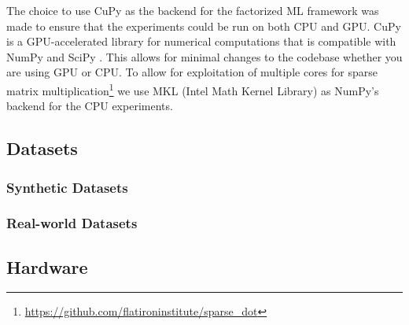 The choice to use CuPy as the backend for the factorized ML framework was made to ensure that the experiments could be run on both CPU and GPU. CuPy is a GPU-accelerated library for numerical computations that is compatible with NumPy and SciPy \cite{cupy_learningsys2017}. This allows for minimal changes to the codebase whether you are using GPU or CPU. To allow for exploitation of multiple cores for sparse matrix multiplication\footnote{\url{https://github.com/flatironinstitute/sparse_dot}} we use MKL (Intel Math Kernel Library) \cite{intel-mkl} as NumPy's backend for the CPU experiments.

\subsection{Datasets}
\label{subsec:6-datasets}
\subsubsection{Synthetic Datasets}

\subsubsection{Real-world Datasets}


\subsection{Hardware}
\label{subsec:6-hardware}

